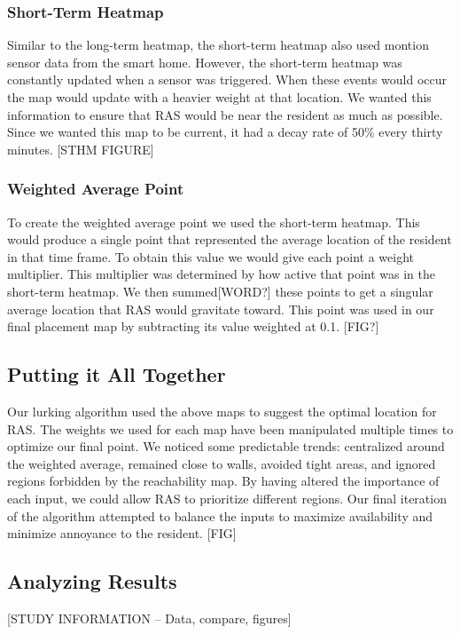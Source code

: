 \documentclass[11pt, draft, a4paper]{IEEEtran}
\begin{document}
\subsubsection{Short-Term Heatmap}
Similar to the long-term heatmap, the short-term heatmap also used montion 
sensor data from the smart home. However, the short-term heatmap was 
constantly updated when a sensor was triggered. When these events would occur 
the map would update with a heavier weight at that location. We wanted this 
information to ensure that RAS would be near the resident as much as possible. 
Since we wanted this map to be current, it had a decay rate of 50\% every 
thirty minutes. [STHM FIGURE]


\subsubsection{Weighted Average Point}
To create the weighted average point we used the short-term heatmap. This 
would produce a single point that represented the average location of the 
resident in that time frame. To obtain this value we would give each point a 
weight multiplier. This multiplier was determined by how active that point was 
in the short-term heatmap. We then summed[WORD?] these points to get a 
singular average location that RAS would gravitate toward. This point was used 
in our final placement map by subtracting its value weighted at 0.1. [FIG?]


\subsection{Putting it All Together}
Our lurking algorithm used the above maps to suggest the optimal location for 
RAS. The weights we used for each map have been manipulated multiple times to 
optimize our final point. We noticed some predictable trends: centralized 
around the weighted average, remained close to walls, avoided tight areas, and 
ignored regions forbidden by the reachability map. By having altered the 
importance of each input, we could allow RAS to prioritize different regions. 
Our final iteration of the algorithm attempted to balance the inputs to 
maximize availability and minimize annoyance to the resident. [FIG]


\subsection{Analyzing Results}
[STUDY INFORMATION -- Data, compare, figures]
\end{document}
